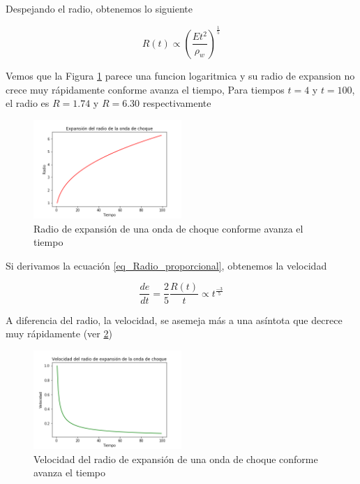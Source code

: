 \documentclass[12pt,a4paper]{book}
\begin{document}
Despejando el radio, obtenemos lo siguiente

\begin{equation} \label{eq_Radio_proporcional}
  R(t) \varpropto \left(\frac{E t^2}{\rho_w}\right)^{\frac{1}{5}}
\end{equation}

Vemos que la Figura \ref{fig_Radio_v_tiempo} parece una funcion logaritmica y su radio de expansion no crece muy rápidamente conforme avanza el tiempo,
Para tiempos $t = 4$ y $t = 100$, el radio es $R = 1.74$ y $R = 6.30$ respectivamente

\begin{figure}
  \centering
    \includegraphics[width=0.5\textwidth]{Figuras/Teoria/Radio_vs_tiempo.png}
  \caption{Radio de expansión de una onda de choque conforme avanza el tiempo } \label{fig_Radio_v_tiempo}
\end{figure}

Si derivamos la ecuación \ref{eq_Radio_proporcional}, obtenemos la velocidad

\begin{equation}
  \dfrac{de}{dt} = \frac{2}{5}\frac{R(t)}{t} \varpropto t^{\frac{-3}{5}}
\end{equation}


A diferencia del radio, la velocidad, se asemeja más a una asíntota que decrece muy rápidamente (ver \ref{fig_velocidad_vs_radio})

\begin{figure}
  \centering
    \includegraphics[width=0.5\textwidth]{Figuras/Teoria/Velocidad_vs_tiempo.png}
  \caption{Velocidad del radio de expansión de una onda de choque conforme avanza el tiempo } \label{fig_velocidad_vs_radio}
\end{figure}
\end{document}

